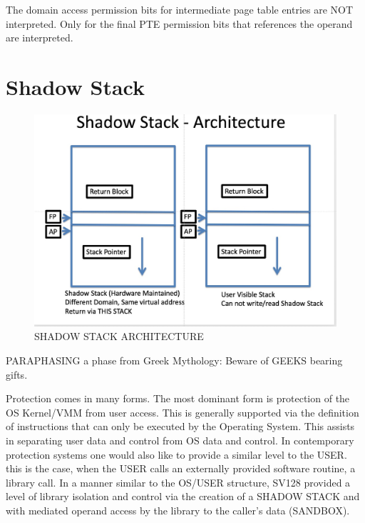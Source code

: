 \documentclass{article}
\begin{document}
The domain access permission bits for intermediate page table entries are NOT interpreted.   Only for the final PTE permission bits that references the operand  are interpreted.

\pagebreak
\section{Shadow Stack}


\begin{figure}[h]
\begin{center}
\includegraphics[scale = .4]
{figures/figure6_shadow_stack.jpg}
\caption{SHADOW STACK  ARCHITECTURE}
\end{center}
\end{figure}


PARAPHASING  a phase from Greek Mythology: Beware of GEEKS bearing gifts.

Protection comes in many forms.  The most dominant form is protection of  the OS Kernel/VMM from user access. This is generally supported via the definition of instructions that  can only be executed by the Operating System.  This assists in separating user data and control from OS  data and control.  In contemporary protection systems one would also like to provide a similar level to the USER.  this is the case, when the USER calls an externally provided software routine,  a library call. In a manner similar to the OS/USER structure, SV128 provided a level of library isolation and control via the creation of a SHADOW STACK  and with mediated operand access by the library to the caller's data (SANDBOX).
\end{document}
